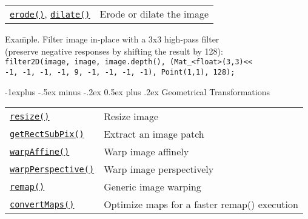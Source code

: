\documentclass[10pt,landscape]{article}
\makeatletter
\renewcommand{\subsection}{\@startsection{subsection}{2}{0mm}%
                                {-1explus -.5ex minus -.2ex}%
                                {0.5ex plus .2ex}%
                                {\normalfont\normalsize\bfseries}}
\makeatother
\begin{document}
\begin{multicols}{3}
\begin{tabular}{@{}p{\the\MyLen}%
                @{}p{\linewidth-\the\MyLen}@{}}
\texttt{\href{http://opencv.willowgarage.com/documentation/cpp/image_filtering.html\#cv-erode}{erode()}}, \texttt{\href{http://opencv.willowgarage.com/documentation/cpp/image_filtering.html\#cv-dilate}{dilate()}} & Erode or dilate the image \\

\end{tabular}

\begin{tabbing}
Exa\=mple. Filter image in-place with a 3x3 high-pass filter\\
\> (preserve negative responses by shifting the result by 128):\\
\texttt{filter2D(image, image, image.depth(), (Mat\_<float>(3,3)<<}\\
\> \texttt{-1, -1, -1, -1, 9, -1, -1, -1, -1), Point(1,1), 128);}\\
\end{tabbing}

\subsection{Geometrical Transformations}

\begin{tabular}{@{}p{\the\MyLen}%
                @{}p{\linewidth-\the\MyLen}@{}}
\texttt{\href{http://opencv.willowgarage.com/documentation/cpp/geometric_image_transformations.html\#cv-resize}{resize()}} & Resize image \\

\texttt{\href{http://opencv.willowgarage.com/documentation/cpp/geometric_image_transformations.html\#cv-getrectsubpix}{getRectSubPix()}} & Extract an image patch \\

\texttt{\href{http://opencv.willowgarage.com/documentation/cpp/geometric_image_transformations.html\#cv-warpaffine}{warpAffine()}} & Warp image affinely\\

\texttt{\href{http://opencv.willowgarage.com/documentation/cpp/geometric_image_transformations.html\#cv-warpperspective}{warpPerspective()}} & Warp image perspectively\\

\texttt{\href{http://opencv.willowgarage.com/documentation/cpp/geometric_image_transformations.html\#cv-remap}{remap()}} & Generic image warping\\

\texttt{\href{http://opencv.willowgarage.com/documentation/cpp/geometric_image_transformations.html\#cv-convertmaps}{convertMaps()}} & Optimize maps for a faster remap() execution\\


\end{tabular}
\end{multicols}
\end{document}
